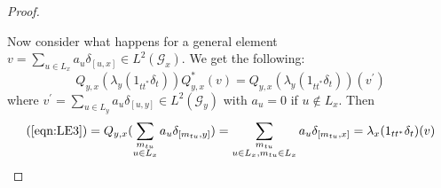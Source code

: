 \documentclass[11pt]{amsart}
\theoremstyle{plain}
\theoremstyle{definition}%
\theoremstyle{remark}%
\begin{document}
\begin{proof}
\begin{figure}
\end{figure}

Now consider what happens for a general element $v = \sum_{u \in L_{x}} a_{u}\delta_{[u,x]} \in L^{2}(\mathcal{G}_{x})$. We get the following:
\begin{equation}\label{eqn:LE3}
Q_{y,x}(\lambda_{y}(1_{tt^{*}}\delta_{t}))Q_{y,x}^{*}(v)=Q_{y,x}(\lambda_{y}(1_{tt^{*}}\delta_{t}))(v^{'})
\end{equation}
where $v^{'}= \sum_{u \in L_{y}} a_{u}\delta_{[u,y]} \in L^{2}(\mathcal{G}_{y})$ with $a_{u}=0$ if $u \not \in L_{x}$. Then 
\begin{eqnarray*}
\mbox{(\ref{eqn:LE3})} = Q_{y,x}(\sum_{\substack{ m_{tu}\\ u \in L_{x}}} a_{u}\delta_{[m_{tu},y]})
=\sum_{\substack{ m_{tu}\\  u \in L_{x},m_{tu} \in L_{x}}}a_{u}\delta_{[m_{tu},x]}=\lambda_{x}(1_{tt^{*}}\delta_{t})(v)
\end{eqnarray*}
\end{proof}
\end{document}
